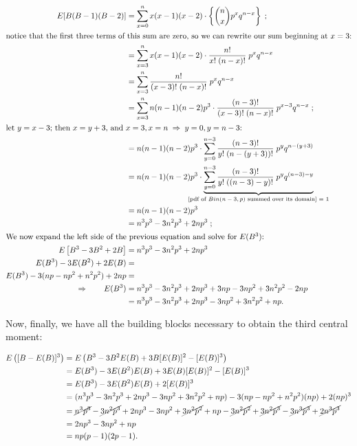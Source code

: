 \documentclass{article}
\begin{document}
\begin{align*}
  E[B(B-1)(B-2)] &= \sum_{x=0}^n x (x-1) (x-2) \cdot \left\{ \binom{n}{x} p^x q^{n-x} \right\} \;; \\
  \intertext{notice that the first three terms of this sum are zero, so we can rewrite our sum beginning at $x = 3$:}
  &= \sum_{x=3}^n x(x-1)(x-2) \cdot \frac{n!}{x!\;(n-x)!} \; p^x q^{n-x} \\
  &= \sum_{x=3}^n \frac{n!}{(x-3)!\;(n-x)!} \; p^x q^{n-x} \\
  &= \sum_{x=3}^n n(n-1)(n-2) p^3 \cdot \frac{(n-3)!}{(x-3)!\;(n-x)!} \; p^{x-3}q^{n-x} \;; \\
  \intertext{let $y=x-3$; then $x=y+3$, and $x=3, x=n \Ra y=0, y=n-3$:}
  &= n(n-1)(n-2)p^3 \cdot \sum_{y=0}^{n-3} \frac{(n-3)!}{y!\;(n-(y+3))!} \; p^y q^{n-(y+3)} \\
  &= n(n-1)(n-2)p^3 \cdot \underbrace {\sum_{y=0}^{n-3} \frac{(n-3)!}{y!\;((n-3)-y)!} \; p^y q^{(n-3)-y}}_{\mathclap{\textnormal{[pdf of $Bin(n-3,p)$ summed over its domain] = 1}}} \\
  &= n(n-1)(n-2)p^3 \\
  &= n^3p^3 - 3n^2p^3 + 2np^3 \;; \\
  \intertext{We now expand the left side of the previous equation and solve for $E(B^3)$:}
  E \left[ B^3 - 3B^2 + 2B \right] &= n^3p^3 - 3n^2p^3 + 2np^3 \\
  E(B^3) - 3E(B^2) + 2E(B) &= \\
  E(B^3) - 3(np - np^2 + n^2p^2) + 2np &= \\
  \Rightarrow \qquad E(B^3) &= n^3p^3 - 3n^2p^3 + 2np^3 + 3np - 3np^2 + 3n^2p^2 - 2np \\
  &= n^3p^3 - 3n^2p^3 + 2np^3 - 3np^2 + 3n^2p^2 + np.
\end{align*}

Now, finally, we have all the building blocks necessary to obtain the third
central moment:

\begin{align*}
  E \left( [B - E(B)]^3 \right) &= E \left( B^3 - 3B^2 E(B) + 3B [E(B)]^2 - [E(B)]^3 \right) \\
  &= E(B^3) - 3 E(B^2) E(B) + 3 E(B) [E(B)]^2 - [E(B)]^3 \\
  &= E(B^3) - 3 E(B^2) E(B) + 2 [E(B)]^3 \\
  &= (n^3p^3 - 3n^2p^3 + 2np^3 - 3np^2 + 3n^2p^2 + np) - 3(np - np^2 + n^2p^2)(np) + 2(np)^3 \\
  &= \cancel{n^3p^3} - \cancel{3n^2p^3} + 2np^3 - 3np^2 + \cancel{3n^2p^2} + np - \cancel{3n^2p^2} + \cancel{3n^2p^3} - \cancel{3n^3p^3} + \cancel{2n^3p^3} \\
  &= 2np^3 - 3np^2 + np \\
  &= np(p-1)(2p-1).
\end{align*}
\end{document}
